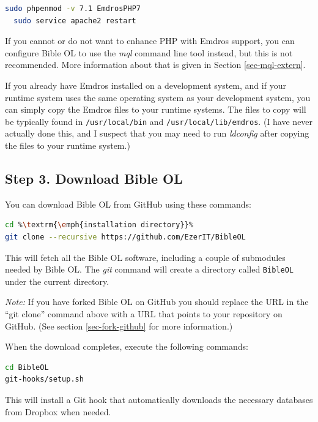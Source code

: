 \documentclass[11pt,oneside,a4paper]{memoir}
\begin{document}
\begin{lstlisting}[language=bash]
  sudo phpenmod -v 7.1 EmdrosPHP7
  sudo service apache2 restart
\end{lstlisting}

If you cannot or do not want to enhance PHP with Emdros support, you can configure Bible OL to use
the \emph{mql} command line tool instead, but this is not recommended. More information
about that is given in Section \ref{sec-mql-extern}.

If you already have Emdros installed on a development system, and if your runtime system uses the
same operating system as your development system, you can simply copy the Emdros files to your
runtime systems. The files to copy will be typically found in \texttt{/usr/local/bin} and
\texttt{/usr/local/lib/emdros}. (I have never actually done this, and I suspect that you may need to
run \emph{ldconfig} after copying the files to your runtime system.)


\subsection{Step 3. Download Bible OL}\label{sec-download-bol}

You can download Bible OL from GitHub using these commands:

\begin{lstlisting}[language=bash]
cd %\textrm{\emph{installation directory}}%
git clone --recursive https://github.com/EzerIT/BibleOL
\end{lstlisting}

This will fetch all the Bible OL software, including a couple of submodules needed by Bible OL. The
\emph{git} command will create a directory called \texttt{BibleOL} under the current directory.

\emph{Note:} If you have forked Bible OL on GitHub you should replace the URL in the ``git clone''
command above with a URL that points to your repository on GitHub. (See section
\ref{sec-fork-github} for more information.)

When the download completes, execute the following commands:

\begin{lstlisting}[language=bash]
cd BibleOL
git-hooks/setup.sh
\end{lstlisting}

This will install a Git hook that automatically downloads the necessary databases
from Dropbox when needed.
\end{document}
